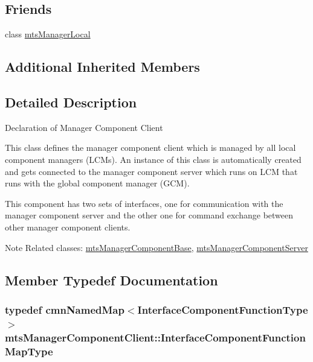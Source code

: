 \subsection*{Friends}
\begin{DoxyCompactItemize}
\item 
class \hyperlink{classmts_manager_component_client_a31c1c611dbb103ac58ed40d84960baa0}{mts\-Manager\-Local}
\end{DoxyCompactItemize}
\subsection*{Additional Inherited Members}


\subsection{Detailed Description}
Declaration of Manager Component Client

This class defines the manager component client which is managed by all local component managers (L\-C\-Ms). An instance of this class is automatically created and gets connected to the manager component server which runs on L\-C\-M that runs with the global component manager (G\-C\-M). 

This component has two sets of interfaces, one for communication with the manager component server and the other one for command exchange between other manager component clients.

\begin{DoxyNote}{Note}
Related classes\-: \hyperlink{classmts_manager_component_base}{mts\-Manager\-Component\-Base}, \hyperlink{classmts_manager_component_server}{mts\-Manager\-Component\-Server} 
\end{DoxyNote}


\subsection{Member Typedef Documentation}
\hypertarget{classmts_manager_component_client_a6f0f9dde52834d02169c3b1feda1cab5}{
\subsubsection[{Interface\-Component\-Function\-Map\-Type}]{\setlength{\rightskip}{0pt plus 5cm}typedef {\bf cmn\-Named\-Map}$<${\bf Interface\-Component\-Function\-Type}$>$ {\bf mts\-Manager\-Component\-Client\-::\-Interface\-Component\-Function\-Map\-Type}\hspace{0.3cm}{\ttfamily [protected]}}}\label{classmts_manager_component_client_a6f0f9dde52834d02169c3b1feda1cab5}


